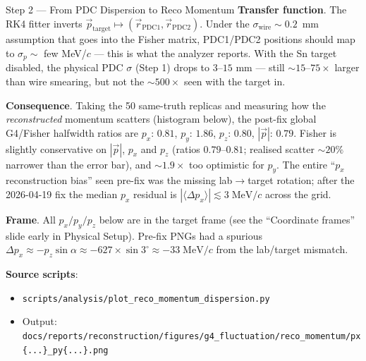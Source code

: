 \documentclass[aspectratio=169]{beamer}
\begin{document}
\begin{frame}{Step 2 --- From PDC Dispersion to Reco Momentum}
\small
\textbf{Transfer function}. The RK4 fitter inverts $\vec p_\mathrm{target} \mapsto (\vec r_\mathrm{PDC1}, \vec r_\mathrm{PDC2})$. Under the $\sigma_\mathrm{wire}\!\sim\!0.2$~mm assumption that goes into the Fisher matrix, PDC1/PDC2 positions should map to $\sigma_p\!\sim$ few MeV/$c$ --- this is what the analyzer reports. With the Sn target disabled, the physical PDC $\sigma$ (Step 1) drops to $3$--$15$ mm --- still $\sim 15$--$75\times$ larger than wire smearing, but not the $\sim 500\times$ seen with the target in.

\textbf{Consequence}. Taking the 50 same-truth replicas and measuring how the \emph{reconstructed} momentum scatters (histogram below), the post-fix global G4/Fisher halfwidth ratios are $p_x:\,0.81$, $p_y:\,1.86$, $p_z:\,0.80$, $|\vec p|:\,0.79$. Fisher is slightly conservative on $|\vec p|$, $p_x$ and $p_z$ (ratios $0.79$--$0.81$; realised scatter $\sim\!20\%$ narrower than the error bar), and $\sim\!1.9\times$ too optimistic for $p_y$. The entire ``$p_x$ reconstruction bias'' seen pre-fix was the missing lab$\to$target rotation; after the 2026-04-19 fix the median $p_x$ residual is $|\langle\Delta p_x\rangle|\lesssim 3\;\mathrm{MeV}/c$ across the grid.

\textbf{Frame}. All $p_x/p_y/p_z$ below are in the target frame (see the ``Coordinate frames'' slide early in Physical Setup). Pre-fix PNGs had a spurious $\Delta p_x \approx -p_z\sin\alpha \approx -627\times\sin 3^\circ \approx -33\;\mathrm{MeV}/c$ from the lab/target mismatch.

\textbf{Source scripts}:
\begin{itemize}
\item \texttt{scripts/analysis/plot\_reco\_momentum\_dispersion.py}
\item Output: \texttt{docs/reports/reconstruction/figures/g4\_fluctuation/reco\_momentum/px\{...\}\_py\{...\}.png}
\end{itemize}
\end{frame}
\end{document}
